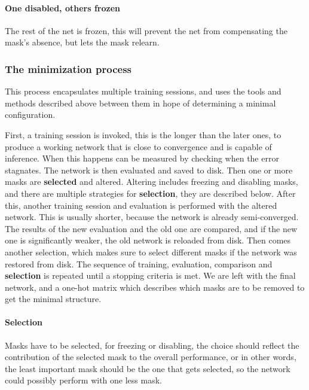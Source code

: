 \documentclass[a4paper,12pt]{article}
\begin{document}
\paragraph{One disabled, others frozen}The rest of the net is frozen, this will prevent the net from compensating the mask's absence, but lets the mask relearn.
\newpage
\subsubsection{The minimization process}
This process encapsulates multiple training sessions, and uses the tools and methods described above between them in hope of determining a minimal configuration.\par
First, a training session is invoked, this is the longer than the later ones, to produce a working network that is close to convergence and is capable of inference. When this happens can be measured by checking when the error stagnates. The network is then evaluated and saved to disk. Then one or more masks are \textbf{selected} and altered. Altering includes freezing and disabling masks, and there are multiple strategies for \textbf{selection}, they are described below. After this, another training session and evaluation is performed with the altered network. This is usually shorter, because the network is already semi-converged. The results of the new evaluation and the old one are compared, and if the new one is significantly weaker, the old network is reloaded from disk. Then comes another selection, which makes sure to select different masks if the network was restored from disk. The sequence of training, evaluation, comparison and \textbf{selection} is repeated until a stopping criteria is met. We are left with the final network, and a one-hot matrix which describes which masks are to be removed to get the minimal structure.
\paragraph{Selection}
Masks have to be selected, for freezing or disabling, the choice should reflect the contribution of the selected mask to the overall performance, or in other words, the least important mask should be the one that gets selected, so the network could possibly perform with one less mask.
\end{document}
